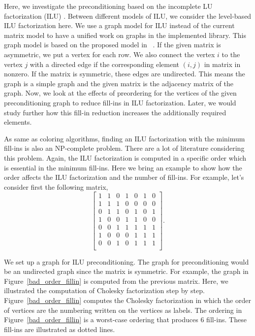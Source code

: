 \documentclass[12pt, twoside,a4paper,toc=bibliography]{scrbook}
\begin{document}
Here, we investigate the preconditioning based on the incomplete LU factorization (ILU) \cite{ilu2003}.
Between different models of ILU, we consider the level-based ILU factorization here.
We use a graph model for ILU instead of the current matrix model to have a unified
work on graphs in the implemented library. This graph model is based on the proposed
model in ~\cite{precond-pothen}. If the given matrix is asymmetric,
we put a vertex for each row. We also connect the vertex $i$ to the
vertex $j$ with a directed edge if the corresponding element $(i,j)$ in matrix
in nonzero. If the matrix is symmetric, these edges are undirected. This means
the graph is a simple graph and the given matrix is the adjacency
matrix of the graph.
Now, we look at the effects of preordering for the vertices of the given preconditioning graph to reduce fill-ins in ILU factorization. Later, we would study further how this fill-in reduction increases the additionally required elements.

As same as coloring algorithms, finding an ILU factorization with the minimum
fill-ins is also an NP-complete problem. There are a lot of literature
considering this problem\cite{ilu_ordering1,ilu_ordering2,ilu_ordering3,ilu_ordering4}.
Again, the ILU factorization is computed in a specific order which is essential
in the minimum fill-ins. Here we bring an example to show how the order affects
the ILU factorization and the number of fill-ins.
For example, let's consider first the following matrix,
$$\begin{bmatrix}
1 & 1 & 0 & 1 & 0 & 1 & 0\\
1 & 1 & 1 & 0 & 0 & 0 & 0\\
0 & 1 & 1 & 0 & 1 & 0 & 1\\
1 & 0 & 0 & 1 & 1 & 0 & 0\\
0 & 0 & 1 & 1 & 1 & 1 & 1\\
1 & 0 & 0 & 0 & 1 & 1 & 1\\
0 & 0 & 1 & 0 & 1 & 1 & 1\\
\end{bmatrix}.$$

We set up a graph for ILU preconditioning.
The graph for preconditioning would be an undirected graph
since the matrix is symmetric.
For example, the graph in Figure~\ref{bad_order_fillin}
is computed from the previous matrix. Here, we illustrated the
computation of Cholesky factorization step by step.
Figure~\ref{bad_order_fillin} computes the Cholesky factorization
in which the order of vertices are the numbering written on the vertices
as labels. The ordering in Figure~\ref{bad_order_fillin} is a worst-case ordering that produces $6$ fill-ins. These fill-ins are illustrated as dotted lines.
\end{document}
